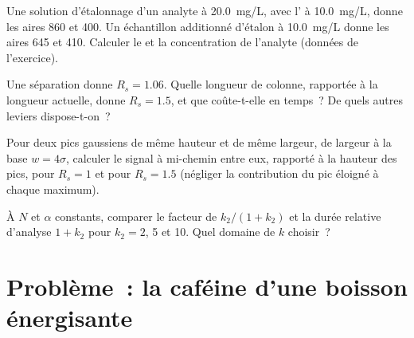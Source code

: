 \begin{exercise}[$\star\star$]\label{exo:b2:chromatography:9}
Une solution d'étalonnage d'un analyte à \qty{20.0}{mg/L}, avec l' à \qty{10.0}{mg/L},
donne les aires 860 et 400. Un échantillon additionné d'étalon à \qty{10.0}{mg/L} donne les aires 645 et
410. Calculer le  et la concentration de l'analyte (données de l'exercice).
\end{exercise}

\begin{exercise}[$\star\star\star$]\label{exo:b2:chromatography:10}
Une séparation donne $R_s = 1.06$. Quelle longueur de colonne, rapportée à la longueur actuelle, donne $R_s = 1.5$, et
que coûte-t-elle en temps~? De quels autres leviers dispose-t-on~?
\end{exercise}

\begin{exercise}[$\star\star\star$]\label{exo:b2:chromatography:11}
Pour deux pics gaussiens de même hauteur et de même largeur, de largeur à la base $w = 4\sigma$, calculer
le signal à mi-chemin entre eux, rapporté à la hauteur des pics, pour $R_s = 1$ et pour $R_s = 1.5$
(négliger la contribution du pic éloigné à chaque maximum).
\end{exercise}

\begin{exercise}[$\star\star\star$]\label{exo:b2:chromatography:12}
À $N$ et $\alpha$ constants, comparer le facteur de  $k_2/(1+k_2)$ et la durée relative
d'analyse $1 + k_2$ pour $k_2 = 2$, 5 et 10. Quel domaine de $k$ choisir~?
\end{exercise}

\section{Problème~: la caféine d'une boisson énergisante}


